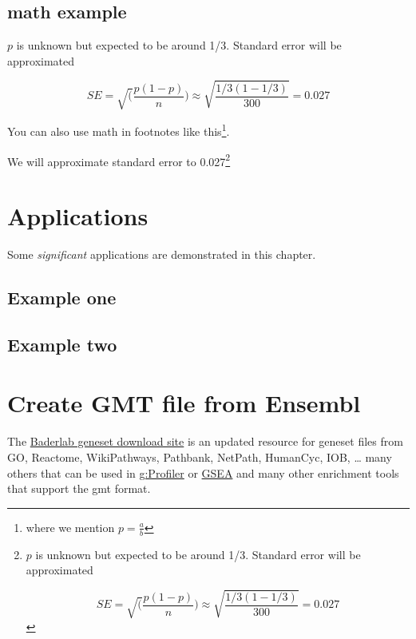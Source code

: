 \documentclass[
]{book}
\begin{document}
\hypertarget{math-example}{%
\section{math example}\label{math-example}}

\(p\) is unknown but expected to be around 1/3. Standard error will be approximated

\[
SE = \sqrt(\frac{p(1-p)}{n}) \approx \sqrt{\frac{1/3 (1 - 1/3)} {300}} = 0.027
\]

You can also use math in footnotes like this\footnote{where we mention \(p = \frac{a}{b}\)}.

We will approximate standard error to 0.027\footnote{\(p\) is unknown but expected to be around 1/3. Standard error will be approximated

  \[
  SE = \sqrt(\frac{p(1-p)}{n}) \approx \sqrt{\frac{1/3 (1 - 1/3)} {300}} = 0.027
  \]}

\hypertarget{applications}{%
\chapter{Applications}\label{applications}}

Some \emph{significant} applications are demonstrated in this chapter.

\hypertarget{example-one}{%
\section{Example one}\label{example-one}}

\hypertarget{example-two}{%
\section{Example two}\label{example-two}}

\hypertarget{create-gmt-file-from-ensembl}{%
\chapter{Create GMT file from Ensembl}\label{create-gmt-file-from-ensembl}}

The \href{https://download.baderlab.org/EM_Genesets/}{Baderlab geneset download site} is an updated resource for geneset files from GO, Reactome, WikiPathways, Pathbank, NetPath, HumanCyc, IOB, \ldots{} many others that can be used in \href{https://biit.cs.ut.ee/gprofiler/gost}{g:Profiler} or \href{https://www.gsea-msigdb.org/gsea/index.jsp}{GSEA} and many other enrichment tools that support the gmt format.
\end{document}
